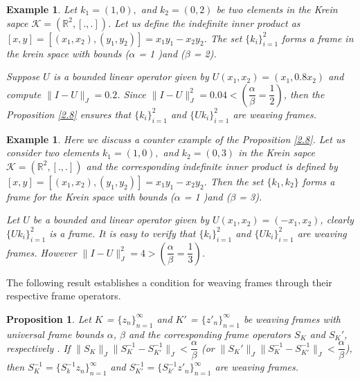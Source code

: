 \documentclass[article,12pt]{amsart}
\newtheorem{prop}[thm]{Proposition}
\newtheorem{ex}[thm]{Example}
\begin{document}
\begin{ex}
	

  Let $k_1 = (1,0),$ and $k_2 = (0, 2) $ be two elements in the Krein sapce $\mathcal{K}=(\mathbb{R}^{2}, [., . ])$. Let us define the indefinite inner product as  $[x, y] = [(x_1, x_2), (y_1, y_2)] = x_1y_1 - x_2y_2$. The set $\{k_i\}^2_{i = 1}$  forms a frame in the krein space with bounds ($\alpha$ = 1 )and ($\beta$ = 2).
				
  Suppose $U$ is a bounded linear operator given by $U(x_1, x_2) = (x_1, 0.8x_2)$ and compute $\|I - U\|_{J} = 0.2$. Since $\|I - U\|^2_{J} = 0.04 < (\dfrac{\alpha}{\beta} = \dfrac{1}{2})$, then the Proposition \ref{2.8} ensures that $\{k_i\}^2_{i = 1}$ and $\{Uk_i\}^2_{i =1}$  are weaving frames.
	\end{ex}

\begin{ex}
	
Here we discuss a counter example of the Proposition \ref{2.8}.
	 Let us consider two elements $k_1 = (1,0),$ and $k_2 = (0, 3) $ in the Krein sapce $\mathcal{K}=(\mathbb{R}^{2}, [., . ])$ and the corresponding indefinite inner product is defined by $[x, y] = [(x_1, x_2), (y_1, y_2)] = x_1y_1 - x_2y_2$. Then the set $\{k_1, k_2\}$ forms a frame for the Krein space with bounds ($\alpha$ = 1 )and ($\beta$ = 3).
	
  Let $U$ be a bounded and  linear operator given by $U(x_1, x_2) = (-x_1, x_2)$, clearly $\{Uk_i\}^2_{i =1}$  is a frame. It is easy to verify that  $\{k_i\}^2_{i = 1}$ and $\{Uk_i\}^2_{i =1}$  are weaving frames.
However $\|I - U\|^2_{J} = 4 > (\dfrac{\alpha}{\beta} = \dfrac{1}{3})$.
	
\end{ex}

The following result establishes a condition for weaving frames through their respective frame operators.

\begin{prop}
	
	Let  $K$ = $\{z_n\}^\infty_{n =1}$ and $K'$ = $\{z'_n\}^\infty_{n= 1}$ be weaving frames  with universal frame bounds $\alpha$, $\beta$ and the corresponding frame operators  $S_K$ and $S_K'$, respectively .
	If  $\|S_K\|_J \|S_K^{-1} - S^{-1}_{K'}\|_J < \dfrac{\alpha}{\beta}$ (or $\|S_K'\|_J \|S_K^{-1} - S^{-1}_{K'}\|_J < \dfrac{\alpha}{\beta}$), then $S^{-1}_K = {\{S^{-1}_kz_n}\}^\infty_{n= 1}$ and $S^{-1}_{K'} = {\{S^{-1}_{k'}z'_n}\}^\infty_{n= 1}$
	are  weaving frames.
	
\end{prop}
\end{document}
